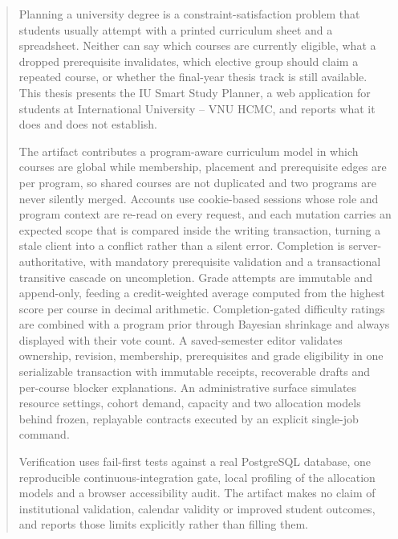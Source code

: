 \begin{abstract}

Planning a university degree is a constraint-satisfaction problem that students usually attempt
with a printed curriculum sheet and a spreadsheet. Neither can say which courses are currently
eligible, what a dropped prerequisite invalidates, which elective group should claim a repeated
course, or whether the final-year thesis track is still available. This thesis presents the IU Smart
Study Planner, a web application for students at International University -- VNU HCMC, and reports
what it does and does not establish.

The artifact contributes a program-aware curriculum model in which courses are global while
membership, placement and prerequisite edges are per program, so shared courses are not duplicated
and two programs are never silently merged. Accounts use cookie-based sessions whose role and
program context are re-read on every request, and each mutation carries an expected scope that is
compared inside the writing transaction, turning a stale client into a conflict rather than a silent
error. Completion is server-authoritative, with mandatory prerequisite validation and a
transactional transitive cascade on uncompletion. Grade attempts are immutable and append-only,
feeding a credit-weighted average computed from the highest score per course in decimal arithmetic.
Completion-gated difficulty ratings are combined with a program prior through Bayesian shrinkage and
always displayed with their vote count. A saved-semester editor validates ownership, revision,
membership, prerequisites and grade eligibility in one serializable transaction with immutable
receipts, recoverable drafts and per-course blocker explanations. An administrative surface
simulates resource settings, cohort demand, capacity and two allocation models behind frozen,
replayable contracts executed by an explicit single-job command.

Verification uses fail-first tests against a real PostgreSQL database, one reproducible
continuous-integration gate, local profiling of the allocation models and a browser accessibility
audit. The artifact makes no claim of institutional validation, calendar validity or improved
student outcomes, and reports those limits explicitly rather than filling them.

\end{abstract}
